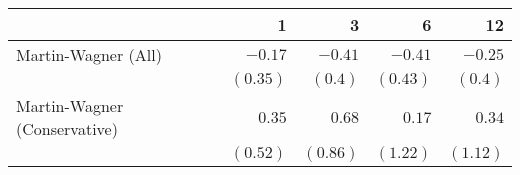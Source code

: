\begin{tabular}{lrrrr}
\toprule
                                     &         1 &         3 &         6 &        12 \\
\midrule
Martin-Wagner (All)  & $-0.17$ & $-0.41$ & $-0.41$ & $-0.25$ \\
 & $(0.35)$ & $(0.4)$ & $(0.43)$ & $(0.4)$ \\
Martin-Wagner (Conservative)  & $0.35$ & $0.68$ & $0.17$ & $0.34$ \\
 & $(0.52)$ & $(0.86)$ & $(1.22)$ & $(1.12)$ \\
\bottomrule
\end{tabular}
\\
